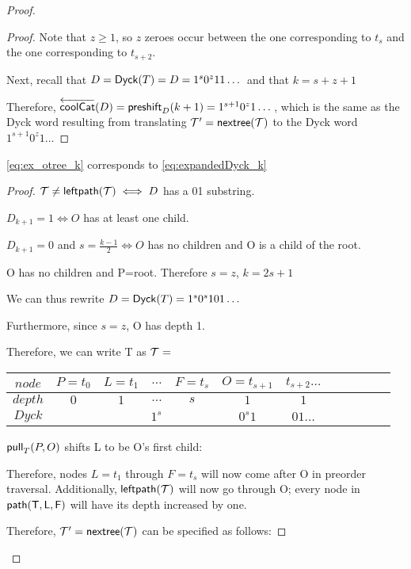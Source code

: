 \begin{proof}
\begin{proof}
    Note that $z \ge 1$, so $z$ zeroes occur between the one corresponding to $t_{s}$ and the one corresponding to $t_{s+2}$.


    Next, recall that $D=\dyck{T}=D=1^s0^z11\dots$ and that $k=s+z+1$

    Therefore, $\coolCat{D}=\preshift{D}{k+1}=1^{s+1}0^z1\dots$, which is the same as the Dyck word resulting from translating $\tree{T}'=\nextTree{T}$ to the Dyck word $1^{s+1}0^z1\dots$

\end{proof}
\begin{lemma}
    \ref{eq:ex_otree_k} corresponds to \ref{eq:expandedDyck_k}
\end{lemma}
\begin{proof}

    $\tree{T} \ne \leftdown{T} \iff D$ has a 01 substring.

    $D_{k+1}=1 \iff O$ has at least one child.

    $D_{k+1}=0$ and $s=\frac{k-1}{2} \iff O$ has no children and O is a child of the root.

    O has no children and P=root. Therefore $s=z$, $k=2s+1$

    We can thus rewrite $D=\dyck{T}=1^s0^s101\dots$

    Furthermore, since $s=z$, O has depth 1. 

    Therefore, we can write T as 
    \noindent $\tree{T}=$
    \begin{center}
	\begin{tabular}{ |c|c|c|c|c|c|c|c|c|c|c|c| } 
	    \hline

	    $node$ & $P=t_0$ & $L=t_1$ & $\dots$ & $F=t_s$ & $O=t_{s+1}$ & $t_{s+2}\dots$ \\
	    \hline
	    $depth$ & $0$ & $1$ & $\dots$ & $s$ & $1$ & $1$ \\
	    \hline
	    $Dyck$ &  &  \multicolumn{3}{|c|}{$1^s$} &  $0^{s}1$   & $01\dots$\\
	    \hline
	\end{tabular}
    \end{center}


    $\poppush[T]{P}{O}$
    shifts L to be O's first child:

    Therefore, nodes $L=t_{1}$ through $F=t_s$ will now come after O in preorder traversal.  Additionally, $\leftdown{T}$ will now go through O; every node in $\path{T}{L}{F}$ will have its depth increased by one.  

    Therefore, $\tree{T}'=\nextTree{T}$ can be specified as follows: 


\end{proof}
\end{proof}
